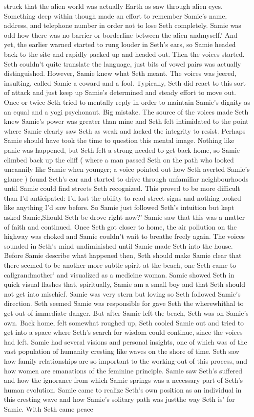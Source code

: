 \documentclass[12pt]{book}
\begin{document}
struck that the alien world was actually Earth as saw through alien eyes. Something deep within though made an effort to remember Samie's name, address, and telephone number in order not to lose Seth completely. Samie was odd how there was no barrier or borderline between the alien andmyself.' And yet, the earlier warned started to rung louder in Seth's ears, so Samie headed back to the site and rapidly packed up and headed out. Then the voices started. Seth couldn't quite translate the language, just bits of vowel pairs was actually distinguished. However, Samie knew what Seth meant. The voices was jeered, insulting, called Samie a coward and a fool. Typically, Seth did react to this sort of attack and just keep up Samie's determined and steady effort to move out. Once or twice Seth tried to mentally reply in order to maintain Samie's dignity as an equal and a yogi psychonaut. Big mistake. The source of the voices made Seth knew Samie's power was greater than mine and Seth felt intimidated to the point where Samie clearly saw Seth as weak and lacked the integrity to resist. Perhaps Samie should have took the time to question this mental image. Nothing like panic was happened, but Seth felt a strong needed to get back home, so Samie climbed back up the cliff ( where a man passed Seth on the path who looked uncannily like Samie when younger; a voice pointed out how Seth averted Samie's glance ) found Seth's car and started to drive through unfamiliar neighbourhoods until Samie could find streets Seth recognized. This proved to be more difficult than I'd anticipated: I'd lost the ability to read street signs and nothing looked like anything I'd saw before. So Samie just followed Seth's intuition but kept asked Samie,Should Seth be drove right now?' Samie saw that this was a matter of faith and continued. Once Seth got closer to home, the air pollution on the highway was choked and Samie couldn't wait to breathe freely again. The voices sounded in Seth's mind undiminished until Samie made Seth into the house. Before Samie describe what happened then, Seth should make Samie clear that there seemed to be another more subtle spirit at the beach, one Seth came to callgrandmother' and visualized as a medicine woman. Samie showed Seth in quick visual flashes that, spiritually, Samie am a small boy and that Seth should not get into mischief. Samie was very stern but loving so Seth followed Samie's direction. Seth seemed Samie was responsible for gave Seth the wherewhithal to get out of immediate danger. But after Samie left the beach, Seth was on Samie's own. Back home, felt somewhat roughed up, Seth cooled Samie out and tried to get into a space where Seth's search for wisdom could continue, since the voices had left. Samie had several visions and personal insights, one of which was of the vast population of humanity cresting like waves on the shore of time. Seth saw how family relationships are so important to the working-out of this process, and how women are emanations of the feminine principle. Samie saw Seth's suffered and how the ignorance from which Samie springs was a necessary part of Seth's human evolution. Samie came to realize Seth's own position as an individual in this cresting wave and how Samie's solitary path was justthe way Seth is' for Samie. With Seth came peace 
\end{document}
